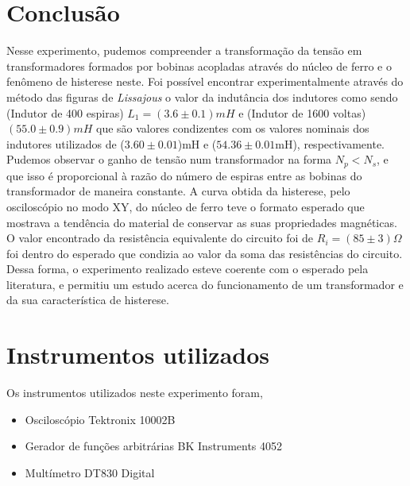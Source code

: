 \documentclass[11pt,a4paper]{article}
\begin{document}
\section{Conclusão}
    Nesse experimento, pudemos compreender a transformação da tensão em transformadores formados por bobinas acopladas através do núcleo de ferro e o fenômeno de histerese neste. 
    Foi possível encontrar experimentalmente através do método das figuras de \textit{Lissajous} o valor da indutância dos indutores como sendo (Indutor de 400 espiras) $L_1 = (3.6 \pm 0.1)mH$ e (Indutor de 1600 voltas) $(55.0 \pm 0.9)mH$ que são valores condizentes com os valores nominais dos indutores utilizados de ($3.60 \pm 0.01$)mH e ($54.36 \pm 0.01$mH), respectivamente.
    Pudemos observar o ganho de tensão num transformador na forma $N_p < N_s$, e que isso é proporcional à razão do número de espiras entre as bobinas do transformador de maneira constante.
    A curva obtida da histerese, pelo osciloscópio no modo XY, do núcleo de ferro teve o formato esperado que mostrava a tendência do material de conservar as suas propriedades magnéticas.
    O valor encontrado da resistência equivalente do circuito foi de $R_i=(85 \pm 3)\Omega$ foi dentro do esperado que condizia ao valor da soma das resistências do circuito.
    Dessa forma, o experimento realizado esteve coerente com o esperado pela literatura, e permitiu um estudo acerca do funcionamento de um transformador e da sua característica de histerese.
    


%
\newpage
\section{Instrumentos utilizados}
Os instrumentos utilizados neste experimento foram,
\begin{itemize}
	\item Osciloscópio Tektronix 10002B
	\item Gerador de funções arbitrárias BK Instruments 4052
	\item Multímetro DT830 Digital
\end{itemize}

%
%
\end{document}
